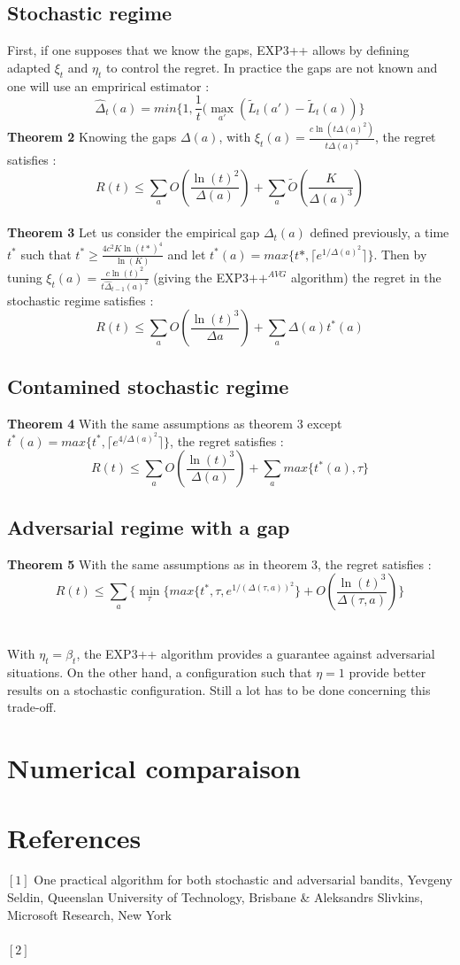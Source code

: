 \documentclass[12pt]{article}
\begin{document}
\subsection*{Stochastic regime}
First, if one supposes that we know the gaps, EXP3++ allows by defining adapted $\xi_{t}$ and $\eta_{t}$ to control the regret. In practice the gaps are not known and one will use an emprirical estimator : $$\hat{\Delta}_{t}(a)=min\{1,\frac{1}{t}(\max_{a'}(\tilde{L}_{t}(a')-\tilde{L}_{t}(a))\}$$
\textbf{Theorem 2} Knowing the gaps $\Delta(a)$, with $\xi_{t}(a)=\frac{c\ln(t\Delta(a)^{2})}{t\Delta(a)^{2}}$, the regret satisfies :
$$R(t) \leq \sum_{a} O(\frac{\ln(t)^{2}}{\Delta(a)})+\sum_{a}\tilde{O}(\frac{K}{\Delta(a)^{3}})$$
~\\
\textbf{Theorem 3} Let us consider the empirical gap $\Delta_{t}(a)$ defined previously, a time $t^{*}$ such that $t^{*}\geq \frac{4c^{2}K\ln(t*)^{4}}{\ln(K)}$ and let $t^{*}(a)=max\{t*,\lceil e^{1/\Delta(a)^{2}}\rceil\}$.
Then by tuning $\xi_{t}(a)=\frac{c\ln(t)^{2}}{t\hat{\Delta}_{t-1}(a)^{2}}$ (giving the EXP3$++^{AVG}$ algorithm) the regret in the stochastic regime satisfies :
$$R(t) \leq \sum_{a}O(\frac{\ln(t)^{3}}{\Delta{a}})+\sum_{a}\Delta(a)t^{*}(a)$$
\subsection*{Contamined stochastic regime}
\textbf{Theorem 4} With the same assumptions as theorem 3 except $t^{*}(a)=max\{t^{*}, \lceil e^{4/\Delta(a)^{2}}\rceil \}$, the regret satisfies :
$$R(t) \leq \sum_{a}O(\frac{\ln(t)^{3}}{\Delta(a)})+\sum_{a}max\{t^{*}(a),\tau\}$$
\subsection*{Adversarial regime with a gap}
\textbf{Theorem 5} With the same assumptions as in theorem 3, the regret satisfies :
$$R(t) \leq \sum_{a}\{\min_{\tau}\{max\{t^{*},\tau,e^{1/(\Delta(\tau,a))^{2}}\}+O(\frac{\ln(t)^{3}}{\Delta(\tau,a)})\}$$~\\
~\\
With $\eta_{t}=\beta_{t}$, the EXP3++ algorithm provides a guarantee against adversarial situations. On the other hand, a configuration such that $\eta=1$ provide better results on a stochastic configuration. Still a lot has to be done concerning this trade-off.
\section*{Numerical comparaison}

\section*{References}
$[1]$ One practical algorithm for both stochastic and adversarial bandits, Yevgeny Seldin, Queenslan University of Technology, Brisbane \& Aleksandrs Slivkins, Microsoft Research, New York~\\
~\\
$[2]$
\end{document}
